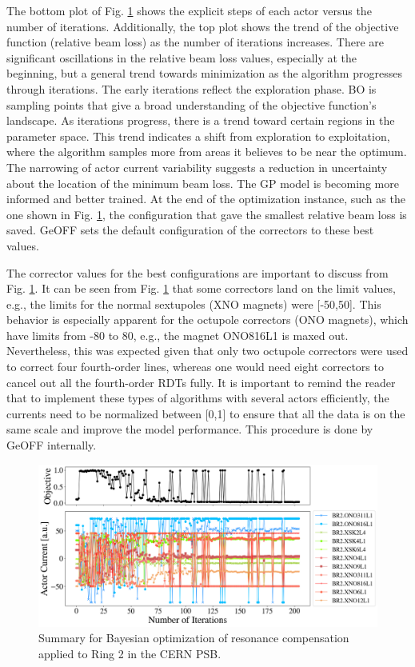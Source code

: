 The bottom plot of Fig. \ref{fig:bo1} shows the explicit steps of each actor versus the number of iterations. Additionally, the top plot shows the trend of the objective function (relative beam loss) as the number of iterations increases. There are significant oscillations in the relative beam loss values, especially at the beginning, but a general trend towards minimization as the algorithm progresses through iterations. The early iterations reflect the exploration phase. BO is sampling points that give a broad understanding of the objective function's landscape. As iterations progress, there is a trend toward certain regions in the parameter space. This trend indicates a shift from exploration to exploitation, where the algorithm samples more from areas it believes to be near the optimum. The narrowing of actor current variability suggests a reduction in uncertainty about the location of the minimum beam loss. The GP model is becoming more informed and better trained. At the end of the optimization instance, such as the one shown in Fig. \ref{fig:bo1}, the configuration that gave the smallest relative beam loss is saved. GeOFF sets the default configuration of the correctors to these best values. 

The corrector values for the best configurations are important to discuss from Fig. \ref{fig:bo1}. It can be seen from Fig. \ref{fig:bo1} that some correctors land on the limit values, e.g., the limits for the normal sextupoles (XNO magnets) were [-50,50]. This behavior is especially apparent for the octupole correctors (ONO magnets), which have limits from -80 to 80, e.g., the magnet ONO816L1 is maxed out. Nevertheless, this was expected given that only two octupole correctors were used to correct four fourth-order lines, whereas one would need eight correctors to cancel out all the fourth-order RDTs fully. It is important to remind the reader that to implement these types of algorithms with several actors efficiently, the currents need to be normalized between [0,1] to ensure that all the data is on the same scale and improve the model performance. This procedure is done by GeOFF internally.    

\begin{figure}[H]
    \centering
    \includegraphics[width=\linewidth]{chapter5/2023_05_02_R2_LHCramp_BayesOpt.png}
    \caption{Summary for Bayesian optimization of resonance compensation applied to Ring 2 in the CERN PSB.}
    \label{fig:bo1}
\end{figure}

